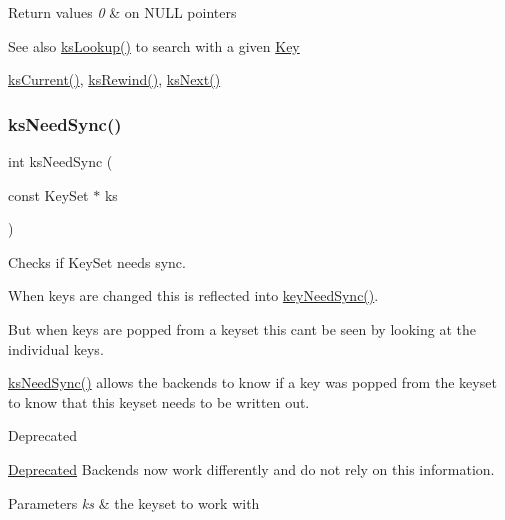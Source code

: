 \begin{DoxyRetVals}{Return values}
{\em 0} & on N\+U\+LL pointers \\
\hline
\end{DoxyRetVals}
\begin{DoxySeeAlso}{See also}
\hyperlink{group__keyset_gaa34fc43a081e6b01e4120daa6c112004}{ks\+Lookup()} to search with a given \hyperlink{group__key}{Key} 

\hyperlink{group__keyset_ga4287b9416912c5f2ab9c195cb74fb094}{ks\+Current()}, \hyperlink{group__keyset_gabe793ff51f1728e3429c84a8a9086b70}{ks\+Rewind()}, \hyperlink{group__keyset_ga317321c9065b5a4b3e33fe1c399bcec9}{ks\+Next()} 
\end{DoxySeeAlso}
\mbox{\label{group__keyset_ga8f210432e664d8ba06d7d55a2aba2d0f}} 
\subsubsection{\texorpdfstring{ks\+Need\+Sync()}{ksNeedSync()}}
{\footnotesize\ttfamily int ks\+Need\+Sync (\begin{DoxyParamCaption}\item[{const Key\+Set $\ast$}]{ks }\end{DoxyParamCaption})}



Checks if Key\+Set needs sync. 

When keys are changed this is reflected into \hyperlink{group__keytest_gaf247df0de7aca04b32ef80e39ef12950}{key\+Need\+Sync()}.

But when keys are popped from a keyset this can\textquotesingle{}t be seen by looking at the individual keys.

\hyperlink{group__keyset_ga8f210432e664d8ba06d7d55a2aba2d0f}{ks\+Need\+Sync()} allows the backends to know if a key was popped from the keyset to know that this keyset needs to be written out.

\begin{DoxyRefDesc}{Deprecated}
\item[\hyperlink{deprecated__deprecated000011}{Deprecated}]Backends now work differently and do not rely on this information.\end{DoxyRefDesc}



\begin{DoxyParams}{Parameters}
{\em ks} & the keyset to work with \\
\hline
\end{DoxyParams}

